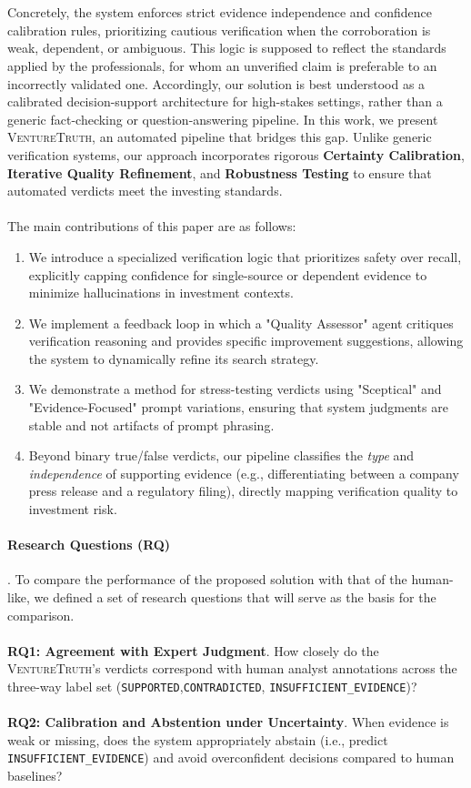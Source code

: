 \\
\\
Concretely, the system enforces strict evidence independence and confidence calibration rules, prioritizing cautious verification when the corroboration is weak, dependent, or ambiguous. This logic is supposed to reflect the standards applied by the professionals, for whom an unverified claim is preferable to an incorrectly validated one. Accordingly, our solution is best understood as a calibrated decision-support architecture for high-stakes settings, rather than a generic fact-checking or question-answering pipeline. In this work, we present \textsc{VentureTruth}, an automated pipeline that bridges this gap. Unlike generic verification systems, our approach incorporates rigorous \textbf{Certainty Calibration}, \textbf{Iterative Quality Refinement}, and \textbf{Robustness Testing} to ensure that automated verdicts meet the investing standards.
\\
\\
The main contributions of this paper are as follows:
\begin{enumerate}
    \item We introduce a specialized verification logic that prioritizes safety over recall, explicitly capping confidence for single-source or dependent evidence to minimize hallucinations in investment contexts.
    \item We implement a feedback loop in which a "Quality Assessor" agent critiques verification reasoning and provides specific improvement suggestions, allowing the system to dynamically refine its search strategy.
    \item We demonstrate a method for stress-testing verdicts using "Sceptical" and "Evidence-Focused" prompt variations, ensuring that system judgments are stable and not artifacts of prompt phrasing.
    \item Beyond binary true/false verdicts, our pipeline classifies the \textit{type} and \textit{independence} of supporting evidence (e.g., differentiating between a company press release and a regulatory filing), directly mapping verification quality to investment risk.
\end{enumerate}

\paragraph{Research Questions (RQ)}. To compare the performance of the proposed solution with that of the human-like, we defined a set of research questions that will serve as the basis for the comparison.
\\
\\
\textbf{RQ1: Agreement with Expert Judgment}.
How closely do the \textsc{VentureTruth}'s verdicts correspond with human analyst annotations across the three-way label set (\texttt{SUPPORTED},\texttt{CONTRADICTED}, \allowbreak \texttt{INSUFFICIENT\_EVIDENCE})?
\\
\\
\textbf{RQ2: Calibration and Abstention under Uncertainty}.
When evidence is weak or missing, does the system appropriately abstain (i.e., predict \texttt{INSUFFICIENT\_EVIDENCE}) and avoid overconfident decisions compared to human baselines?

